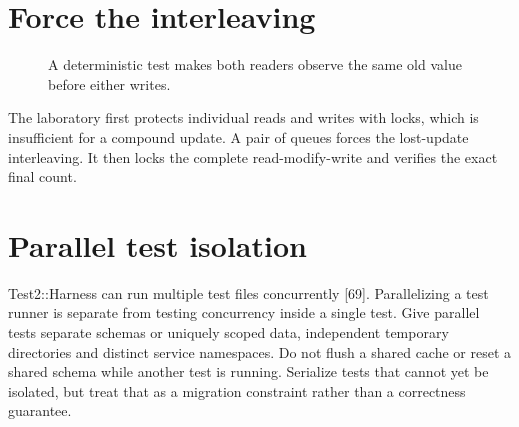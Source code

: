 \section{Force the interleaving}
\begin{figure}[!htbp]\centering
{}
\caption{A deterministic test makes both readers observe the same old value before either writes.}
\end{figure}
The laboratory first protects individual reads and writes with locks,
which is insufficient for a compound update. A pair of queues forces
the lost-update interleaving. It then locks the complete read-modify-write
and verifies the exact final count.

\section{Parallel test isolation}
Test2::Harness can run multiple test files concurrently [69].
Parallelizing a test runner is separate from testing concurrency inside a
single test. Give parallel tests separate schemas or uniquely scoped data,
independent temporary directories and distinct service namespaces. Do not
flush a shared cache or reset a shared schema while another test is running.
Serialize tests that cannot yet be isolated, but treat that as a migration
constraint rather than a correctness guarantee.

